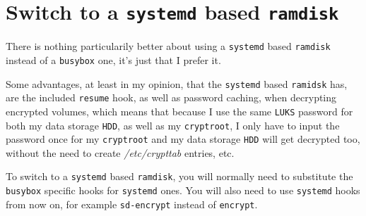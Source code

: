 \documentclass[9pt]{report}
\newenvironment{NOTE}
{\begin{tcolorbox}[colback=admonitionBG,coltitle=draculaFG,colframe=draculaBlue,colbacktitle=draculaBlue,title=NOTE]}
{\end{tcolorbox}}
\begin{document}
\hypertarget{x-switch-to-a-systemd-based-ramdisk}{\section{Switch to a \texttt{systemd} based \texttt{ramdisk}}}
\begin{NOTE}
    There is nothing particularily better about using a \texttt{systemd} based \texttt{ramdisk} instead of a \texttt{busybox} one, it’s just that I prefer it.


    Some advantages, at least in my opinion, that the \texttt{systemd} based \texttt{ramidsk} has, are the included \texttt{resume} hook, as well as password caching, when decrypting encrypted volumes, which means that because I use the same \texttt{LUKS} password for both my data storage \texttt{HDD}, as well as my \texttt{cryptroot}, I only have to input the password once for my \texttt{cryptroot} and my data storage \texttt{HDD} will get decrypted too, without the need to create \textit{/etc/crypttab} entries, etc.

\end{NOTE}
To switch to a \texttt{systemd} based \texttt{ramdisk}, you will normally need to substitute the \texttt{busybox} specific hooks for \texttt{systemd} ones.
You will also need to use \texttt{systemd} hooks from now on, for example \texttt{sd-encrypt} instead of \texttt{encrypt}.
\end{document}
